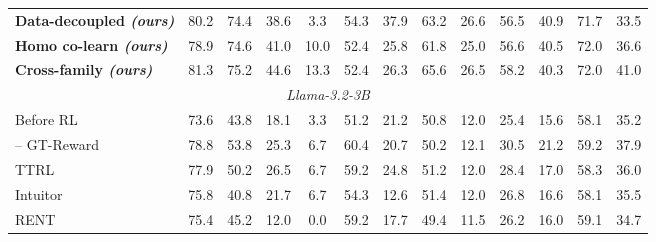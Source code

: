 \begin{table}[t]
\begin{tabular}{lcccccccccccc}
\textbf{Data-decoupled \emph{(ours)}} & \cellcolor{heat!23}80.2 & \cellcolor{heat!39}74.4 & \cellcolor{heat!6}38.6 & \cellcolor{heat!6}3.3 & \cellcolor{heat!58}54.3 & \cellcolor{heat!58}37.9 & \cellcolor{heat!27}63.2 & \cellcolor{heat!58}26.6 & \cellcolor{heat!38}56.5 & \cellcolor{heat!39}40.9 & \cellcolor{heat!6}71.7 & \cellcolor{heat!6}33.5 \\
\textbf{Homo co-learn \emph{(ours)}} & \cellcolor{heat!7}78.9 & \cellcolor{heat!43}74.6 & \cellcolor{heat!21}41.0 & \cellcolor{heat!41}10.0 & \cellcolor{heat!32}52.4 & \cellcolor{heat!6}25.8 & \cellcolor{heat!9}61.8 & \cellcolor{heat!27}25.0 & \cellcolor{heat!39}56.6 & \cellcolor{heat!30}40.5 & \cellcolor{heat!33}72.0 & \cellcolor{heat!21}36.6 \\
\textbf{Cross-family \emph{(ours)}} & \cellcolor{heat!38}81.3 & \cellcolor{heat!54}75.2 & \cellcolor{heat!43}44.6 & \cellcolor{heat!58}13.3 & \cellcolor{heat!32}52.4 & \cellcolor{heat!8}26.3 & \cellcolor{heat!58}65.6 & \cellcolor{heat!56}26.5 & \cellcolor{heat!58}58.2 & \cellcolor{heat!25}40.3 & \cellcolor{heat!39}72.0 & \cellcolor{heat!41}41.0 \\
\midrule
\multicolumn{13}{c}{\textit{Llama-3.2-3B}}\\
\midrule
Before RL & 73.6 & 43.8 & 18.1 & 3.3 & 51.2 & 21.2 & 50.8 & 12.0 & 25.4 & 15.6 & 58.1 & 35.2 \\
\hspace{1em}-- GT-Reward & 78.8 & 53.8 & 25.3 & 6.7 & 60.4 & 20.7 & 50.2 & 12.1 & 30.5 & 21.2 & 59.2 & 37.9 \\
\cmidrule(lr){1-13}
TTRL & \cellcolor{heat!32}77.9 & \cellcolor{heat!38}50.2 & \cellcolor{heat!48}26.5 & \cellcolor{heat!27}6.7 & \cellcolor{heat!58}59.2 & \cellcolor{heat!58}24.8 & \cellcolor{heat!53}51.2 & \cellcolor{heat!44}12.0 & \cellcolor{heat!38}28.4 & \cellcolor{heat!17}17.0 & \cellcolor{heat!39}58.3 & \cellcolor{heat!39}36.0 \\
Intuitor & \cellcolor{heat!11}75.8 & \cellcolor{heat!6}40.8 & \cellcolor{heat!34}21.7 & \cellcolor{heat!27}6.7 & \cellcolor{heat!6}54.3 & \cellcolor{heat!6}12.6 & \cellcolor{heat!58}51.4 & \cellcolor{heat!44}12.0 & \cellcolor{heat!20}26.8 & \cellcolor{heat!12}16.6 & \cellcolor{heat!36}58.1 & \cellcolor{heat!26}35.5 \\
RENT & \cellcolor{heat!7}75.4 & \cellcolor{heat!21}45.2 & \cellcolor{heat!6}12.0 & \cellcolor{heat!6}0.0 & \cellcolor{heat!58}59.2 & \cellcolor{heat!28}17.7 & \cellcolor{heat!11}49.4 & \cellcolor{heat!23}11.5 & \cellcolor{heat!14}26.2 & \cellcolor{heat!6}16.0 & \cellcolor{heat!58}59.1 & \cellcolor{heat!6}34.7 \\

\end{tabular}
\end{table}
